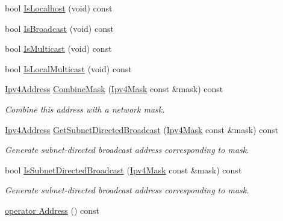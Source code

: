\begin{DoxyCompactItemize}
\item 
bool \hyperlink{classns3_1_1Ipv4Address_acd7dcbde35cf301876c9a5244ac3795c}{Is\+Localhost} (void) const 
\item 
bool \hyperlink{classns3_1_1Ipv4Address_acff8d940bf4cc9282cf67c75eb9d777f}{Is\+Broadcast} (void) const 
\item 
bool \hyperlink{classns3_1_1Ipv4Address_a7dac4e93c61099b55ba711b137e31c77}{Is\+Multicast} (void) const 
\item 
bool \hyperlink{classns3_1_1Ipv4Address_a1a072239d7be84f9a2a454f4f9647dc4}{Is\+Local\+Multicast} (void) const 
\item 
\hyperlink{classns3_1_1Ipv4Address}{Ipv4\+Address} \hyperlink{classns3_1_1Ipv4Address_abc9bf1629800f0809d97dfd8b5c38bc7}{Combine\+Mask} (\hyperlink{classns3_1_1Ipv4Mask}{Ipv4\+Mask} const \&mask) const 
\begin{DoxyCompactList}\small\item\em Combine this address with a network mask. \end{DoxyCompactList}\item 
\hyperlink{classns3_1_1Ipv4Address}{Ipv4\+Address} \hyperlink{classns3_1_1Ipv4Address_a685b27840c2d37f623c99ac2ad6f756c}{Get\+Subnet\+Directed\+Broadcast} (\hyperlink{classns3_1_1Ipv4Mask}{Ipv4\+Mask} const \&mask) const 
\begin{DoxyCompactList}\small\item\em Generate subnet-\/directed broadcast address corresponding to mask. \end{DoxyCompactList}\item 
bool \hyperlink{classns3_1_1Ipv4Address_a7ffcabe8733abc82ed0ff1ff40e6b4a7}{Is\+Subnet\+Directed\+Broadcast} (\hyperlink{classns3_1_1Ipv4Mask}{Ipv4\+Mask} const \&mask) const 
\begin{DoxyCompactList}\small\item\em Generate subnet-\/directed broadcast address corresponding to mask. \end{DoxyCompactList}\item 
\hyperlink{classns3_1_1Ipv4Address_af5e96f621d9840a4a4478abe061c091e}{operator Address} () const 
\end{DoxyCompactItemize}
